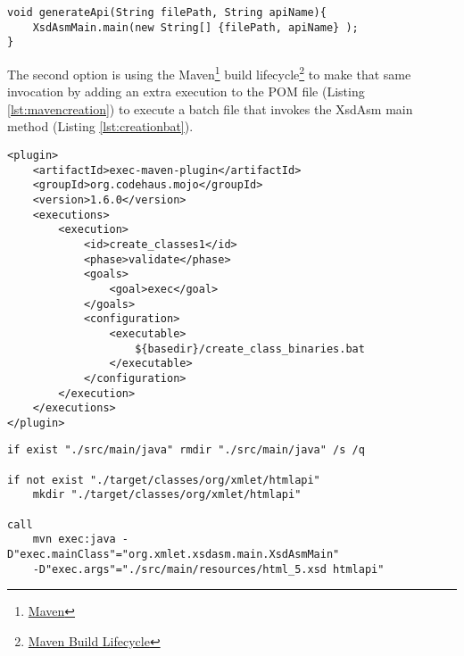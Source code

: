 \bigskip


\begin{minipage}{\linewidth}
\begin{lstlisting}[caption={API creation},label={lst:directapicreation}]
void generateApi(String filePath, String apiName){
    XsdAsmMain.main(new String[] {filePath, apiName} );    
}
\end{lstlisting}
\end{minipage}

\noindent
The second option is using the Maven\footnote{\href{https://maven.apache.org/}{Maven}} build lifecycle\footnote{\href{https://maven.apache.org/guides/introduction/introduction-to-the-lifecycle.html\#Build_Lifecycle_Basics}{Maven Build Lifecycle}} to make that same invocation by adding an extra execution to the \ac{POM} file (Listing \ref{lst:mavencreation}) to execute a batch file that invokes the XsdAsm main method (Listing \ref{lst:creationbat}). 

\bigskip


\begin{minipage}{\linewidth}
\begin{lstlisting}[caption={Maven API compile classes plugin},label={lst:mavencreation}]
<plugin>
    <artifactId>exec-maven-plugin</artifactId>
    <groupId>org.codehaus.mojo</groupId>
    <version>1.6.0</version>
    <executions>
        <execution>
            <id>create_classes1</id>
            <phase>validate</phase>
            <goals>
                <goal>exec</goal>
            </goals>
            <configuration>
                <executable>
                    ${basedir}/create_class_binaries.bat
                </executable>
            </configuration>
        </execution>
    </executions>
</plugin>
\end{lstlisting}
\end{minipage}


\begin{minipage}{\linewidth}
\begin{lstlisting}[caption={Maven API creation batch file (create\_class\_binaries.bat)},label={lst:creationbat}]
if exist "./src/main/java" rmdir "./src/main/java" /s /q

if not exist "./target/classes/org/xmlet/htmlapi" 
    mkdir "./target/classes/org/xmlet/htmlapi"

call 
    mvn exec:java -D"exec.mainClass"="org.xmlet.xsdasm.main.XsdAsmMain" 
    -D"exec.args"="./src/main/resources/html_5.xsd htmlapi"
\end{lstlisting}
\end{minipage}

